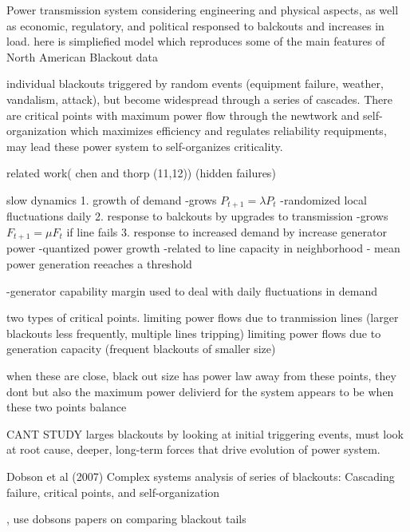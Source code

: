Power transmission system considering engineering and physical aspects, as well as economic, regulatory, and political responsed to balckouts and increases in load.
here is simpliefied model which reproduces some of the main features of North American Blackout data

individual blackouts triggered by random events (equipment failure, weather, vandalism, attack), but become widespread through a series of cascades.  There are critical points with maximum power flow through the newtwork and self-organization which maximizes efficiency and regulates reliability requipments, may lead these power system to self-organizes criticality.

related work( chen and thorp (11,12)) (hidden failures)

slow dynamics 
1. growth of demand
-grows $P_{t+1} = \lambda P_t$
-randomized local fluctuations daily
2. response to balckouts by upgrades to transmission
-grows $F_{t+1} = \mu F_t$ if line fails
3. response to increased demand by increase generator power
-quantized power growth
-related to line capacity in neighborhood
- mean power generation reeaches a threshold

-generator capability margin used to deal with daily fluctuations in demand

two types of critical points.
limiting power flows due to tranmission lines   (larger blackouts less frequently, multiple lines tripping)
limiting power flows due to generation capacity  (frequent blackouts of smaller size)


when these are close, black out size has power law
away from these points, they dont
but also the maximum power delivierd for the system appears to be when these two points balance


CANT STUDY larges blackouts by looking at initial triggering events, must look at root cause, deeper, long-term forces that drive evolution of power system.

%
Dobson et al (2007) Complex systems analysis of series of blackouts: Cascading failure, critical points, and self-organization \cite{dobson_2007}
%

, use dobsons papers on comparing blackout tails







